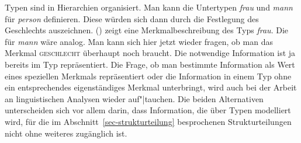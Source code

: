 Typen sind in Hierarchien organisiert.
Man kann \zb die Untertypen \textit{frau} und \textit{mann} für \textit{person}
definieren. Diese würden sich dann durch die Festlegung des Geschlechts auszeichnen.
() zeigt eine Merkmalbeschreibung des Typs \textit{frau}. Die für \textit{mann}
wäre analog.
\ea
{}
\z
Man kann sich hier jetzt wieder fragen, ob man das Merkmal \textsc{geschlecht} überhaupt
noch braucht. Die notwendige Information ist ja bereits im Typ  repräsentiert.
Die Frage, ob man bestimmte Information als Wert eines speziellen Merkmals repräsentiert oder die
Information in einem Typ ohne ein entsprechendes eigenständiges Merkmal unterbringt,  
wird auch bei der Arbeit an linguistischen Analysen wieder auf"|tauchen.
Die beiden Alternativen unterscheiden sich vor allem darin, dass Information, die
über Typen modelliert wird, für die im Abschnitt~\ref{sec-strukturteilung} besprochenen Strukturteilungen
nicht ohne weiteres %
zugänglich ist.


